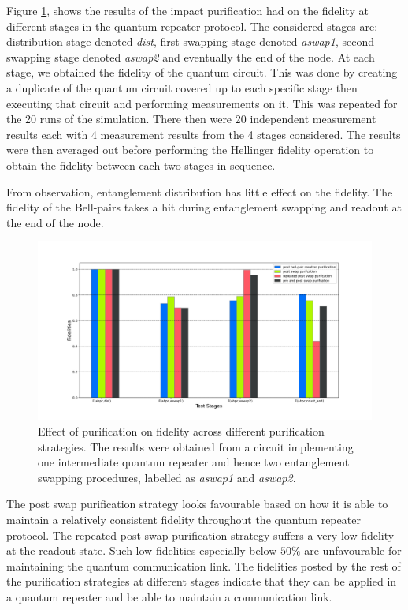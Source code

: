 \documentclass[11pt]{article}
\begin{document}
Figure \ref{fig:deutsch_purification_strategy}, shows the results of the impact purification had on the fidelity at different stages in the quantum repeater protocol. The considered stages are: distribution stage denoted \textit{dist}, first swapping stage denoted \textit{aswap1}, second swapping stage denoted \textit{aswap2} and eventually the end of the node. At each stage, we obtained the fidelity of the quantum circuit. This was done by creating a duplicate of the quantum circuit covered up to each specific stage then executing that circuit and performing measurements on it. This was repeated for the 20 runs of the simulation. There then were 20 independent measurement results each with 4 measurement results from the 4 stages considered. The results were then averaged out before performing the Hellinger fidelity operation to obtain the fidelity between each two stages in sequence.

From observation, entanglement distribution has little effect on the fidelity. The fidelity of the Bell-pairs takes a hit during entanglement swapping and readout at the end of the node.
\begin{figure}[ht]
    \centering
    \includegraphics[width=\textwidth]{figures/deutsch_purification_strategy.jpg}
    \caption[Purification strategy]{Effect of purification on fidelity across different purification strategies. The results were obtained from a circuit implementing one intermediate quantum repeater and hence two entanglement swapping procedures, labelled as \textit{aswap1} and \textit{aswap2}.}
    \label{fig:deutsch_purification_strategy}
\end{figure}

The post swap purification strategy looks favourable based on how it is able to maintain a relatively consistent fidelity throughout the quantum repeater protocol. The repeated post swap purification strategy suffers a very low fidelity at the readout state. Such low fidelities especially below $50\%$ are unfavourable for maintaining the quantum communication link. The fidelities posted by the rest of the purification strategies at different stages indicate that they can be applied in a quantum repeater and be able to maintain a communication link.
\end{document}
